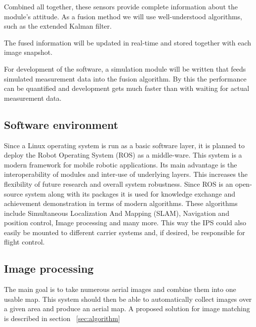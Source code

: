\documentclass[fontsize=11pt,paper=a4,]{scrartcl}
\begin{document}
Combined all together, these sensors provide complete information about the module's attitude.
As a fusion method we will use well-understood algorithms, such as the extended Kalman filter.

The fused information will be updated in real-time and stored together with each image snapshot.

For development of the software, a simulation module will be written that feeds simulated measurement data into the fusion algorithm.
By this the performance can be quantified and development gets much faster than with waiting for actual measurement data. 


\FloatBarrier
\subsection{Software environment}
Since a Linux operating system is run as a basic software layer, it is planned to deploy the Robot Operating System (ROS) as a middle-ware. This system is a modern framework
for mobile robotic applications. Its main advantage is the interoperability of modules and inter-use of underlying 
layers. This increases the flexibility of future research and overall system robustness. Since ROS is an open-source system along with its packages it is used for knowledge exchange and achievement demonstration in terms of modern algorithms. These algorithms include Simultaneous Localization
And Mapping (SLAM), Navigation and position control, Image processing and many more. This way the IPS could also easily be mounted to different carrier systems and, if desired, be responsible for flight control.

\subsection{Image processing}
The main goal is to take numerous aerial images and combine them into one usable map. This system should then be able
to automatically collect images over a given area and produce an aerial map. A proposed solution
for image matching is described in section ~\ref{sec:algorithm}
\end{document}
